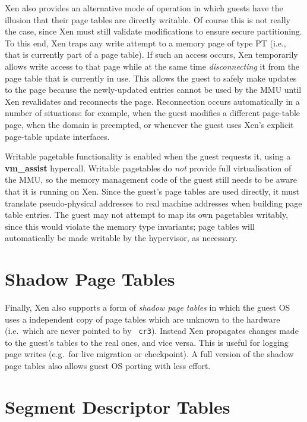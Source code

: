 \documentclass[11pt,twoside,final,openright]{report}
\begin{document}
Xen also provides an alternative mode of operation in which guests
have the illusion that their page tables are directly writable.  Of
course this is not really the case, since Xen must still validate
modifications to ensure secure partitioning. To this end, Xen traps
any write attempt to a memory page of type {\sf PT} (i.e., that is
currently part of a page table).  If such an access occurs, Xen
temporarily allows write access to that page while at the same time
\emph{disconnecting} it from the page table that is currently in use.
This allows the guest to safely make updates to the page because the
newly-updated entries cannot be used by the MMU until Xen revalidates
and reconnects the page.  Reconnection occurs automatically in a
number of situations: for example, when the guest modifies a different
page-table page, when the domain is preempted, or whenever the guest
uses Xen's explicit page-table update interfaces.

Writable pagetable functionality is enabled when the guest requests
it, using a {\bf vm\_assist} hypercall.  Writable pagetables do {\em
not} provide full virtualisation of the MMU, so the memory management
code of the guest still needs to be aware that it is running on Xen.
Since the guest's page tables are used directly, it must translate
pseudo-physical addresses to real machine addresses when building page
table entries.  The guest may not attempt to map its own pagetables
writably, since this would violate the memory type invariants; page
tables will automatically be made writable by the hypervisor, as
necessary.

\section{Shadow Page Tables}

Finally, Xen also supports a form of \emph{shadow page tables} in
which the guest OS uses a independent copy of page tables which are
unknown to the hardware (i.e.\ which are never pointed to by {\tt
  cr3}). Instead Xen propagates changes made to the guest's tables to
the real ones, and vice versa. This is useful for logging page writes
(e.g.\ for live migration or checkpoint). A full version of the shadow
page tables also allows guest OS porting with less effort.


\section{Segment Descriptor Tables}
\end{document}

